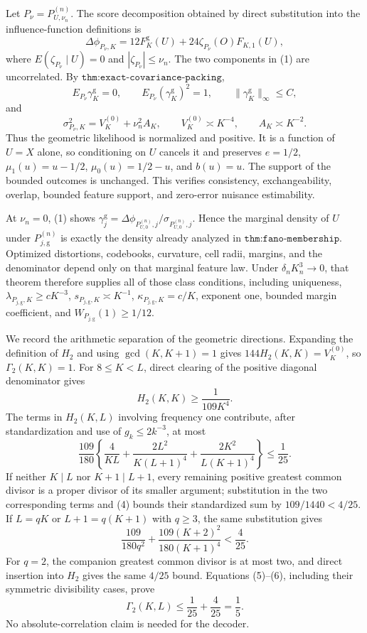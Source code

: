 Let \(P_\nu=P_{U,\nu_n}^{(n)}\).  The score decomposition obtained by direct substitution into the influence-function definitions is
\[
 \Delta\phi_{P_\nu,K}
 =12F^{\mathrm g}_K(U)+24\zeta_{P_\nu}(O)F_{K,1}(U),                                    \tag{1}
\]
where \(E(\zeta_{P_\nu}\mid U)=0\) and \(|\zeta_{P_\nu}|\leq\nu_n\).  The two components in (1) are uncorrelated.  By \(\texttt{thm:exact-covariance-packing}\),
\[
 E_{P_\nu}\gamma_K^{\mathrm g}=0,\qquad
 E_{P_\nu}(\gamma_K^{\mathrm g})^2=1,\qquad
 \|\gamma_K^{\mathrm g}\|_\infty\leq C,                                               \tag{2}
\]
and
\[
 \sigma_{P_\nu,K}^2=V_K^{(0)}+\nu_n^2A_K,\qquad
 V_K^{(0)}\asymp K^{-4},\qquad A_K\asymp K^{-2}.                                       \tag{3}
\]
Thus the geometric likelihood is normalized and positive.  It is a function of \(U=X\) alone, so conditioning on \(U\) cancels it and preserves \(e=1/2\), \(\mu_1(u)=u-1/2\), \(\mu_0(u)=1/2-u\), and \(b(u)=u\).  The support of the bounded outcomes is unchanged.  This verifies consistency, exchangeability, overlap, bounded feature support, and zero-error nuisance estimability.

At \(\nu_n=0\), (1) shows \(\gamma_j^{\mathrm g}=\Delta\phi_{P_{U,0}^{(n)},j}/\sigma_{P_{U,0}^{(n)},j}\).  Hence the marginal density of \(U\) under \(P_{j,\mathrm g}^{(n)}\) is exactly the density already analyzed in \(\texttt{thm:fano-membership}\).  Optimized distortions, codebooks, curvature, cell radii, margins, and the denominator depend only on that marginal feature law.  Under \(\delta_nK_n^3\to0\), that theorem therefore supplies all of those class conditions, including uniqueness, \(\lambda_{P_{j,\mathrm g},K}\geq cK^{-3}\), \(s_{P_{j,\mathrm g},K}\asymp K^{-1}\), \(\kappa_{P_{j,\mathrm g},K}=c/K\), exponent one, bounded margin coefficient, and \(W_{P_{j,\mathrm g}}(1)\geq1/12\).

We record the arithmetic separation of the geometric directions.  Expanding the definition of \(H_2\) and using \(\gcd(K,K+1)=1\) gives \(144H_2(K,K)=V_K^{(0)}\), so \(\Gamma_2(K,K)=1\).  For \(8\leq K<L\), direct clearing of the positive diagonal denominator gives
\[
 H_2(K,K)\geq\frac1{109K^4}.                                                            \tag{4}
\]
The terms in \(H_2(K,L)\) involving frequency one contribute, after standardization and use of \(g_k\leq2k^{-3}\), at most
\[
 \frac{109}{180}\left\{\frac4{KL}
 +\frac{2L^2}{K(L+1)^4}+\frac{2K^2}{L(K+1)^4}\right\}\leq\frac1{25}.                   \tag{5}
\]
If neither \(K\mid L\) nor \(K+1\mid L+1\), every remaining positive greatest common divisor is a proper divisor of its smaller argument; substitution in the two corresponding terms and (4) bounds their standardized sum by \(109/1440<4/25\).  If \(L=qK\) or \(L+1=q(K+1)\) with \(q\geq3\), the same substitution gives
\[
 \frac{109}{180q^2}+\frac{109(K+2)^2}{180(K+1)^4}<\frac4{25}.                            \tag{6}
\]
For \(q=2\), the companion greatest common divisor is at most two, and direct insertion into \(H_2\) gives the same \(4/25\) bound.  Equations (5)--(6), including their symmetric divisibility cases, prove
\[
 \Gamma_2(K,L)\leq\frac1{25}+\frac4{25}=\frac15.                                       \tag{7}
\]
No absolute-correlation claim is needed for the decoder.

